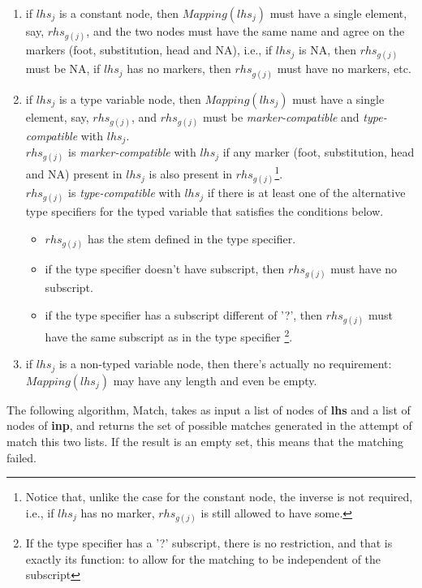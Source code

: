 \begin{enumerate}

\item if $lhs_j$ is a constant node, then $Mapping(lhs_j)$ must have a 
	single element, say, $rhs_{g(j)}$, and the two nodes must have the same
	name and agree on the markers (foot, substitution, head and NA), i.e.,
	if $lhs_j$ is NA, then $rhs_{g(j)}$ must be NA, 
	if $lhs_j$ has no markers, then $rhs_{g(j)}$ must have no markers, etc.

\item if $lhs_j$ is a type variable node, then $Mapping(lhs_j)$ must have a 
	single element, say, $rhs_{g(j)}$, and $rhs_{g(j)}$ must be 
	{\it marker-compatible} and 
	{\it type-compatible} with $lhs_j$. \\
	$rhs_{g(j)}$ is 
	{\it marker-compatible} with $lhs_j$ if any marker
	 (foot, substitution, head and NA) present in $lhs_j$ is also
	present in $rhs_{g(j)}$\footnote{Notice that, unlike the case for the
	constant node, the inverse is not required, 
	i.e., if $lhs_j$ has no marker, $rhs_{g(j)}$ is still 
	allowed to have some.}.\\
	$rhs_{g(j)}$ is {\it type-compatible} with $lhs_j$ 
	if there is at least one of the alternative 
	type specifiers for the typed variable that satisfies 
	the conditions below. 

\begin{itemize}
\item	$rhs_{g(j)}$ has the stem defined in the type specifier.
\item	if the type specifier doesn't have subscript, then 
	$rhs_{g(j)}$ must have no subscript.
\item	if the type specifier has a subscript different of '?', then 
	$rhs_{g(j)}$ must have the same subscript as in the type specifier
	\footnote{If the type specifier has a '?' subscript, there is no
	restriction, and that is exactly its function: to allow for the 
	matching to be independent of the subscript}.
\end{itemize}

\item if $lhs_j$ is a non-typed variable node, then there's actually no
	requirement: $Mapping(lhs_j)$ may have any length and even be 
	empty.
\end{enumerate}
	
The following algorithm, Match, takes as input a list of nodes of {\bf lhs}
and a list of nodes of {\bf inp}, and returns the set of possible matches
generated in the attempt of match this two lists. If the result is an empty
set, this means that the matching failed.


